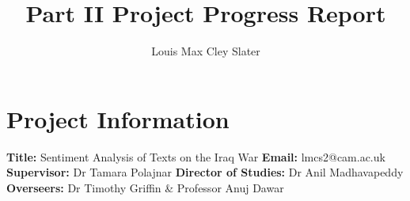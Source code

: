 \documentclass[]{article}
\title{Part II Project Progress Report}
\author{Louis Max Cley Slater}
\begin{document}
\maketitle

\section*{Project Information}
\textbf{Title:} Sentiment Analysis of Texts on the Iraq War
\newline
\textbf{Email:} lmcs2@cam.ac.uk
\newline
\textbf{Supervisor:} Dr Tamara Polajnar
\newline
\textbf{Director of Studies:} Dr Anil Madhavapeddy
\newline
\textbf{Overseers:} Dr Timothy Griffin \& Professor Anuj Dawar
\end{document}
